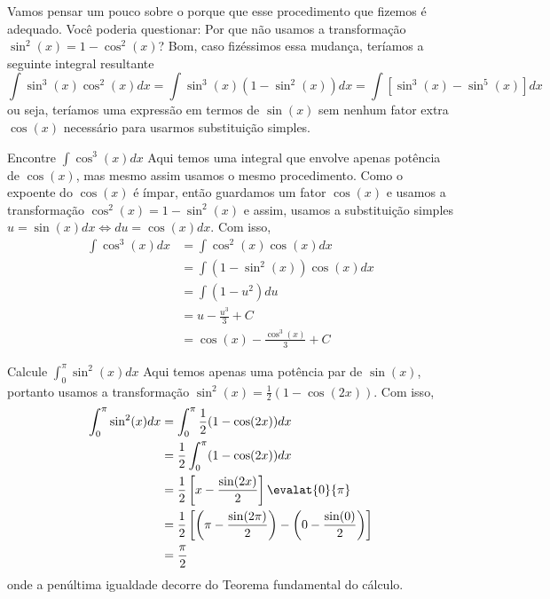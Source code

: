 Vamos pensar um pouco sobre o porque que esse procedimento que fizemos é adequado.
Você poderia questionar: Por que não usamos a transformação
$\sin^2(x)=1-\cos^2(x)$?
Bom, caso fizéssimos essa mudança, teríamos a seguinte integral resultante
\[
  \int \sin^3(x)\cos^2(x)dx
  = \int   \sin^3(x)(1-\sin^2(x))dx
  = \int [ \sin^3(x)- \sin^5(x)]dx
\]
ou seja, teríamos uma expressão em termos de $\sin(x)$ sem nenhum fator
extra $\cos(x)$ necessário para usarmos substituição simples.

\begin{example}
  Encontre \(\int \cos^3(x)dx\)
  \solution
  Aqui temos uma integral que envolve apenas potência de
  $\cos(x)$, mas mesmo assim usamos o mesmo procedimento.
  Como o expoente do $\cos(x)$ é ímpar, então guardamos um fator
  $\cos(x)$ e usamos a transformação $\cos^2(x)= 1-\sin^2(x)$ e assim,
  usamos a substituição simples $u= \sin(x) dx \Leftrightarrow du=\cos(x)dx$.
  Com isso,
  \begin{align*}
    \int \cos^3(x)dx & = \int \cos^2(x) \cos(x)dx       \\
                     & = \int (1-\sin^2(x))\cos(x)dx    \\
                     & = \int (1-u^2)du                 \\
                     & = u- \frac{u^3}{3}+C             \\
                     & = \cos(x)- \frac{\cos^3(x)}{3}+C
  \end{align*}
\end{example}

\begin{example}
  Calcule \(\int_0^{\pi} \sin^2(x) dx\)
  \solution
  Aqui temos apenas uma potência par de $\sin(x)$,
  portanto usamos a transformação
  $\sin^2(x)= \frac{1}{2}(1-\cos(2x))$.
  Com isso,
  \begin{align*}
    \int_0^{\pi} \sin^2(x) dx
    & = \int_0^\pi \frac{1}{2}(1-\cos(2x)) dx \\
    & = \frac{1}{2} \int_0^\pi (1-\cos(2x)) dx \\
    & = \frac{1}{2} \left[  x - \frac{\sin(2x)}{2}\right] \evalat{0}{\pi} \\
    & = \frac{1}{2}
        \left[
          \left( \pi - \frac{\sin(2\pi)}{2} \right)
         -\left(   0 - \frac{\sin(0)}{2}    \right)
        \right] \\
    & = \frac{\pi}{2}
  \end{align*}
  onde a penúltima igualdade decorre do Teorema fundamental do cálculo.
\end{example}

